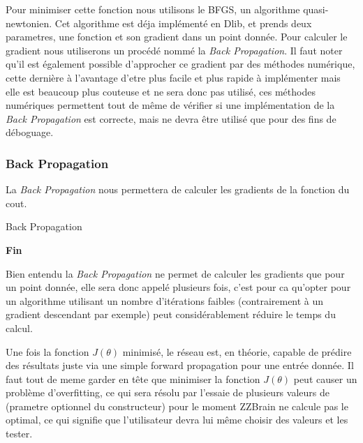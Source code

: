Pour minimiser cette fonction nous utilisons le BFGS, un algorithme quasi-newtonien. Cet algorithme est déja implémenté en Dlib, et prends deux parametres, une fonction et son gradient dans un point donnée. Pour calculer le gradient nous utiliserons un procédé nommé la \textit{Back Propagation}. Il faut noter qu'il est également possible d'approcher ce gradient par des méthodes numérique, cette dernière à l'avantage d'etre plus facile et plus rapide à implémenter mais elle est beaucoup plus couteuse et ne sera donc pas utilisé, ces méthodes numériques permettent tout de même de vérifier si une implémentation de la \textit{Back Propagation} est correcte, mais ne devra être utilisé que pour des fins de déboguage.

\subsubsection{Back Propagation}

La \textit{Back Propagation} nous permettera de calculer les gradients de la fonction du cout.

\begin{algorithm}[H] %
 \caption{Back Propagation}
     \SetAlgoLined
\textbf{Fin}
\end{algorithm}

Bien entendu la \textit{Back Propagation} ne permet de calculer les gradients que pour un point donnée, elle sera donc appelé plusieurs fois, c'est pour ca qu'opter pour un algorithme utilisant un nombre d'itérations faibles (contrairement à un gradient descendant par exemple) peut considérablement réduire le temps du calcul.

Une fois la fonction $J(\theta)$ minimisé, le réseau est, en théorie, capable de prédire des résultats juste via une simple forward propagation pour une entrée donnée. Il faut tout de meme garder en tête que minimiser la fonction $J(\theta)$ peut causer un problème d'overfitting, ce qui sera résolu par l'essaie de plusieurs valeurs de \lambda (prametre optionnel du constructeur) pour le moment ZZBrain ne calcule pas le \lambda optimal, ce qui signifie que l'utilisateur devra lui même choisir des valeurs et les tester.

